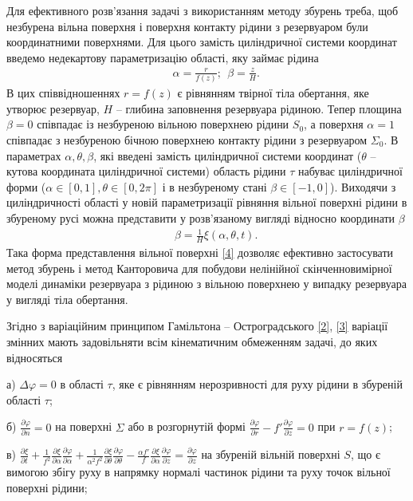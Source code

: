 \documentclass[11pt, reqno]{amsart}
\begin{document}
Для ефективного розв'язання задачі з використанням методу збурень треба, щоб незбурена вільна поверхня і поверхня контакту рідини з резервуаром були координатними поверхнями. Для цього замість циліндричної системи координат введемо недекартову параметризацію області, яку займає рідина
\begin{eqnarray*}
   &&\alpha = \frac{r}{f(z)}; \ \ \beta =\frac{z}{H}.
\end{eqnarray*}
В цих співвідношеннях $r=f(z)$ є рівнянням твірної тіла обертання, яке утворює резервуар, $H$ -- глибина заповнення резервуара рідиною. Тепер площина $\beta=0$ співпадає із незбуреною вільною поверхнею рідини $S_0$, а поверхня $\alpha=1$ співпадає з незбуреною бічною поверхнею контакту рідини з резервуаром $\Sigma_0$. В параметрах $\alpha, \theta, \beta$, які введені замість циліндричної системи координат ($\theta$ -- кутова координата циліндричної системи) область рідини $\tau$ набуває циліндричної форми ($\alpha \in [0,1], \theta \in [0, 2\pi]$ і в незбуреному стані $\beta \in [-1, 0]$). Виходячи з циліндричності області у новій параметризації рівняння вільної поверхні рідини в збуреному русі можна представити у розв'язаному вигляді відносно координати $\beta$
\begin{eqnarray}\label{4}
   &&\beta =\frac{1}{H}\xi (\alpha, \theta, t).
\end{eqnarray}
Така форма представлення вільної поверхні \eqref{4} дозволяє ефективно застосувати метод збурень і метод Канторовича для побудови нелінійної скінченновимірної моделі динаміки резервуара з рідиною з вільною поверхнею у випадку резервуара у вигляді тіла обертання.

Згідно з варіаційним принципом Гамільтона -- Остроградського \eqref{2}, \eqref{3} варіації змінних мають задовільняти всім кінематичним обмеженням задачі, до яких відносяться

а) $\Delta \varphi =0$ в області  $\tau$, яке є рівнянням нерозривності для руху рідини в збуреній області $\tau$;

б) $\displaystyle \frac{\partial \varphi}{\partial n} =0 $ на поверхні $\Sigma$ або в розгорнутій формі $\displaystyle \frac{\partial \varphi}{\partial r} - f' \frac{\partial \varphi}{\partial z} =0 $ при $r=f(z)$;

в) $\displaystyle \frac{\partial \xi}{\partial t} +\frac{1}{f^2} \frac{\partial \xi}{\partial \alpha} \frac{\partial \varphi }{\partial \alpha} +\frac{1}{\alpha^2 f^2} \frac{\partial \xi}{\partial \theta} \frac{\partial \varphi }{\partial \theta} - \frac{\alpha f'}{f} \frac{\partial \xi}{\partial \alpha} \frac{\partial \varphi }{\partial z} = \frac{\partial \varphi }{\partial z} $ на збуреній вільній поверхні $S$, що є вимогою збігу руху в напрямку нормалі частинок рідини та руху точок вільної поверхні рідини;
\end{document}
